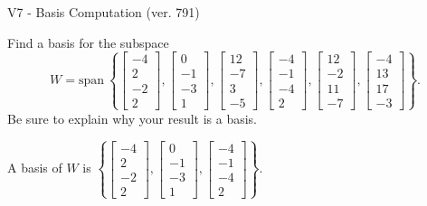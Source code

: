\begin{exercise}
  \begin{exerciseTitle}V7 - Basis Computation (ver. 791)\end{exerciseTitle}
  \begin{exerciseStatement}
    Find a basis for the subspace 
\[W=\mathrm{span}\ \left\{\left[\begin{array}{r}
-4 \\
2 \\
-2 \\
2
\end{array}\right] , \left[\begin{array}{r}
0 \\
-1 \\
-3 \\
1
\end{array}\right] , \left[\begin{array}{r}
12 \\
-7 \\
3 \\
-5
\end{array}\right] , \left[\begin{array}{r}
-4 \\
-1 \\
-4 \\
2
\end{array}\right] , \left[\begin{array}{r}
12 \\
-2 \\
11 \\
-7
\end{array}\right] , \left[\begin{array}{r}
-4 \\
13 \\
17 \\
-3
\end{array}\right]\right\}.\]
 Be sure to explain why your result is a basis.


  \end{exerciseStatement}
  \begin{exerciseAnswer}
   A basis of \(W\) is  \(\left\{\left[\begin{array}{r}
-4 \\
2 \\
-2 \\
2
\end{array}\right] , \left[\begin{array}{r}
0 \\
-1 \\
-3 \\
1
\end{array}\right] , \left[\begin{array}{r}
-4 \\
-1 \\
-4 \\
2
\end{array}\right]\right\}\).
  


  \end{exerciseAnswer}
\end{exercise}
